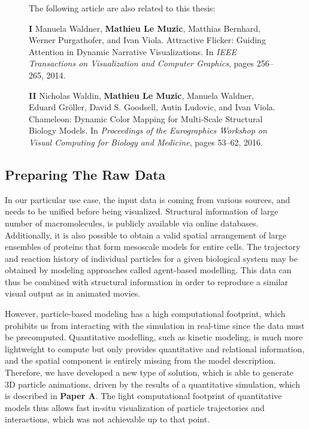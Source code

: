 \begin{figure}
{		The following article are also related to this thesis:	
		\begin{list}{}{}			
			\item[\textbf{I}]Manuela Waldner, \textbf{Mathieu Le Muzic}, Matthias Bernhard, Werner Purgathofer, and Ivan Viola. 
			Attractive Flicker: Guiding Attention in Dynamic Narrative Visualizations. 
			In \textit{IEEE Transactions on Visualization and Computer Graphics}, pages 256–265, 2014.	
			
			\item[\textbf{II}]Nicholas Waldin, \textbf{Mathieu Le Muzic}, Manuela Waldner, Eduard Gröller, David S. Goodsell, Autin Ludovic, and Ivan Viola. 
			Chameleon: Dynamic Color Mapping for Multi-Scale Structural Biology Models. 
			In \textit{Proceedings of the Eurographics Workshop on Visual Computing for Biology and Medicine}, pages 53–62, 2016.						
		\end{list}		
	}	
	\label{master-diagram}	
\end{figure}


\subsection{Preparing The Raw Data}

In our particular use case, the input data is coming from various sources, and needs to be unified before being visualized.
Structural information of large number of macromolecules, is publicly available via online databases.
Additionally, it is also possible to obtain a valid spatial arrangement of large ensembles of proteins that form mesoscale models for entire cells.
The trajectory and reaction history of individual particles for a given biological system may be obtained by modeling approaches called agent-based modelling.
This data can thus be combined with structural information in order to reproduce a similar visual output as in animated movies.

However, particle-based modeling has a high computational footprint, which prohibits us from interacting with the simulation in real-time since the data must be precomputed.
Quantitative modelling, such as kinetic modeling, is much more lightweight to compute but only provides quantitative and relational information, and the spatial component is entirely missing from the model description.
Therefore, we have developed a new type of solution, which is able to generate 3D particle animations, driven by the results of a quantitative simulation, which is described in \textbf{Paper A}.
The light computational footprint of quantitative models thus allows fast in-situ visualization of particle trajectories and interactions, which was not achievable up to that point.

